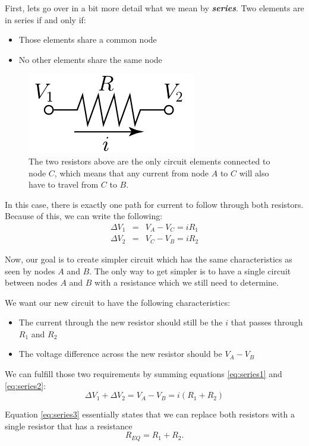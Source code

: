 First, lets go over in a bit more detail what we mean by {\it \bf series}. Two elements are in series if and only if:
\begin{itemize}
\item Those elements share a common node
\item No other elements share the same node
\end{itemize}

\begin{figure}
  \includegraphics{figures/ohmsLaw}
  \caption{The two resistors above are the only circuit elements connected to node $C$, which means that any current from node $A$ to $C$ will also have to travel from $C$ to $B$.}
  \label{fig:series}
\end{figure}

In this case, there is exactly one path for current to follow through both resistors.  Because of this, we can write the following:
\begin{eqnarray}
  \label{eq:series1} \Delta V_1 &=& V_A-V_C = i R_1 \\ 
  \label{eq:series2} \Delta V_2 &=& V_C-V_B = i R_2 
\end{eqnarray}

Now, our goal is to create simpler circuit which has the same characteristics as seen by nodes $A$ and $B$. The only way to get simpler is to have a single circuit between nodes $A$ and $B$ with a resistance which we still need to determine.

We want our new circuit to have the following characteristics:
\begin{itemize}
\item The current through the new resistor should still be the $i$ that passes through $R_1$ and $R_2$
\item The voltage difference across the new resistor should be $V_A - V_B$
\end{itemize}

We can fulfill those two requirements by summing equations \ref{eq:series1} and \ref{eq:series2}:
\begin{equation} \label{eq:series3}
\Delta V_1 + \Delta V_2 = V_A - V_B = i (R_1 + R_2)
\end{equation}

Equation \ref{eq:series3} essentially states that we can replace both resistors with a single resistor that has a resistance
\begin{equation} \label{eq:seriesEquivalent}
R_{EQ}=R_1+R_2.
\end{equation}
